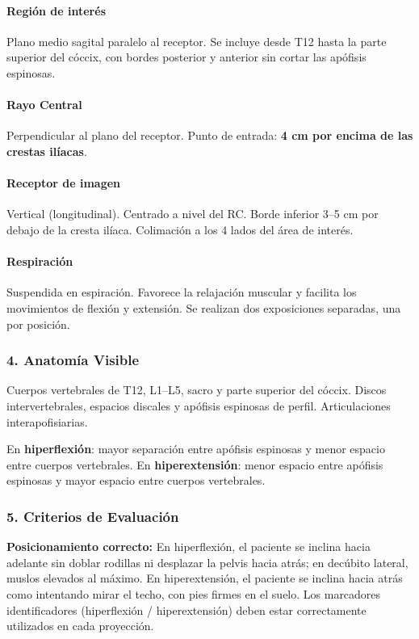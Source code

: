 		
		\paragraph{Región de interés}
		Plano medio sagital paralelo al receptor. Se incluye desde T12 hasta la parte superior del cóccix, con bordes posterior y anterior sin cortar las apófisis espinosas.
		
		\paragraph{Rayo Central}
		Perpendicular al plano del receptor. Punto de entrada: \textbf{4 cm por encima de las crestas ilíacas}.
		
		\paragraph{Receptor de imagen}
		Vertical (longitudinal). Centrado a nivel del RC. Borde inferior 3--5 cm por debajo de la cresta ilíaca. Colimación a los 4 lados del área de interés.
		
		\paragraph{Respiración}
		Suspendida en espiración. Favorece la relajación muscular y facilita los movimientos de flexión y extensión. Se realizan dos exposiciones separadas, una por posición.
		
		\subsubsection*{4. Anatomía Visible}
		
		Cuerpos vertebrales de T12, L1--L5, sacro y parte superior del cóccix. Discos intervertebrales, espacios discales y apófisis espinosas de perfil. Articulaciones interapofisiarias.
		
		En \textbf{hiperflexión}: mayor separación entre apófisis espinosas y menor espacio entre cuerpos vertebrales. En \textbf{hiperextensión}: menor espacio entre apófisis espinosas y mayor espacio entre cuerpos vertebrales.
		
		\subsubsection*{5. Criterios de Evaluación}
		
		\textbf{Posicionamiento correcto:} En hiperflexión, el paciente se inclina hacia adelante sin doblar rodillas ni desplazar la pelvis hacia atrás; en decúbito lateral, muslos elevados al máximo. En hiperextensión, el paciente se inclina hacia atrás como intentando mirar el techo, con pies firmes en el suelo. Los marcadores identificadores (hiperflexión / hiperextensión) deben estar correctamente utilizados en cada proyección.
		

